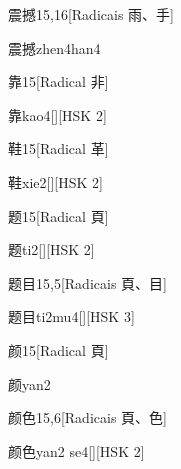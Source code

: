 \begin{entry}{震撼}{15,16}[Radicais ⾬、⼿]
  \begin{phonetics}{震撼}{zhen4han4}
  \end{phonetics}
\end{entry}

\begin{entry}{靠}{15}[Radical ⾮]
  \begin{phonetics}{靠}{kao4}[][HSK 2]
  \end{phonetics}
\end{entry}

\begin{entry}{鞋}{15}[Radical ⾰]
  \begin{phonetics}{鞋}{xie2}[][HSK 2]
  \end{phonetics}
\end{entry}

\begin{entry}{题}{15}[Radical ⾴]
  \begin{phonetics}{题}{ti2}[][HSK 2]
  \end{phonetics}
\end{entry}

\begin{entry}{题目}{15,5}[Radicais ⾴、⽬]
  \begin{phonetics}{题目}{ti2mu4}[][HSK 3]
  \end{phonetics}
\end{entry}

\begin{entry}{颜}{15}[Radical ⾴]
  \begin{phonetics}{颜}{yan2}
  \end{phonetics}
\end{entry}

\begin{entry}{颜色}{15,6}[Radicais ⾴、⾊]
  \begin{phonetics}{颜色}{yan2 se4}[][HSK 2]
  \end{phonetics}
\end{entry}

